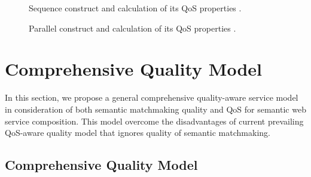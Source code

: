 \documentclass{llncs}
\begin{document}
\begin{figure}[h]
\centerline{
}
\caption{Sequence construct and calculation of its QoS properties
\cite{yu2013adaptive}.}
\label{sequence}
\vspace{0.2cm}
\centerline{
}
\caption{Parallel construct and calculation of its QoS properties
\cite{yu2013adaptive}.}
\label{parallel}
\end{figure}





\section{Comprehensive Quality Model}\label{Comprehensive_Quality_Model}
In this section, we propose a general comprehensive quality-aware service model in consideration of both semantic matchmaking quality and QoS for semantic web service composition. This model overcome the disadvantages of current prevailing QoS-aware quality model that ignores quality of semantic matchmaking.


\subsection{Comprehensive Quality Model}\label{qualityModel}
\end{document}
